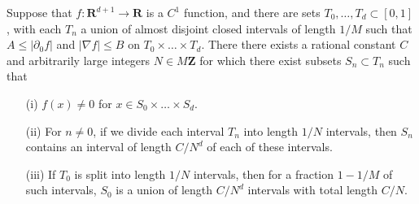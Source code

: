\begin{theorem}
    Suppose that $f: \mathbf{R}^{d+1} \to \mathbf{R}$ is a $C^1$ function, and there are sets $T_0, \dots, T_d \subset [0,1]$, with each $T_n$ a union of almost disjoint closed intervals of length $1/M$ such that $A \leq |\partial_0 f|$ and $|\nabla f| \leq B$ on $T_0 \times \dots \times T_d$. There there exists a rational constant $C$ and arbitrarily large integers $N \in M \mathbf{Z}$ for which there exist subsets $S_n \subset T_n$ such that
    \begin{itemize}
        \item[(i)] $f(x) \neq 0$ for $x \in S_0 \times \dots \times S_d$.

        \item[(ii)] For $n \neq 0$, if we divide each interval $T_n$ into length $1/N$ intervals, then $S_n$ contains an interval of length $C/N^d$ of each of these intervals.

        \item[(iii)] If $T_0$ is split into length $1/N$ intervals, then for a fraction $1 - 1/M$ of such intervals, $S_0$ is a union of length $C/N^d$ intervals with total length $C/N$.
    \end{itemize}
\end{theorem}
